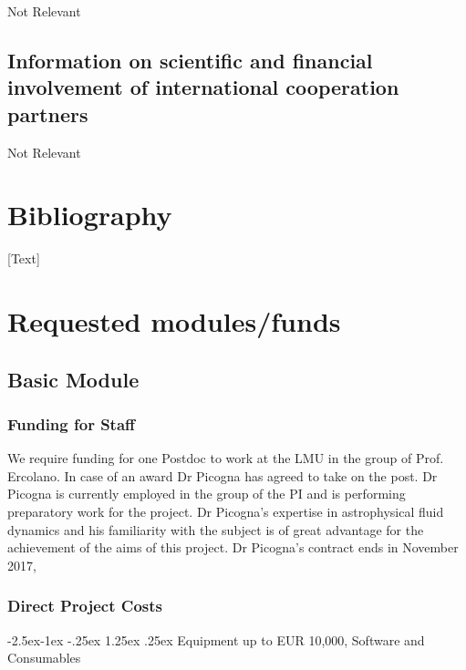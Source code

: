 \documentclass[10pt,fleqn,twoside]{article}
\makeatletter
\newcommand{\Tcol}{\color{blue}}
\renewcommand\paragraph{\@startsection{paragraph}{4}{\z@}%
            {-2.5ex\@plus -1ex \@minus -.25ex}%
            {1.25ex \@plus .25ex}%
            {\normalfont\normalsize\bfseries}}
\makeatother
\begin{document}
Not Relevant

\subsection{\Tcol Information on scientific and financial involvement of international cooperation partners}

Not Relevant

\section{\Tcol Bibliography}

[Text]

\section{\Tcol Requested modules/funds}
\renewcommand{\leftmark}{\sc  Requested modules/funds}

\subsection{\Tcol Basic Module}

\subsubsection{\Tcol Funding for Staff}

We require funding for one Postdoc to work at the LMU in the group of
Prof. Ercolano. In case of an award Dr Picogna has agreed to
take on the post. Dr Picogna is currently employed in the group of the
PI and is performing preparatory work for the project. Dr Picogna's
expertise in astrophysical fluid dynamics and his familiarity with the
subject is of great advantage for the achievement of the aims of this
project. Dr Picogna's contract ends in November 2017, 

\subsubsection{\Tcol Direct Project Costs}


\paragraph{\Tcol Equipment up to EUR 10,000, Software and Consumables}
\end{document}
